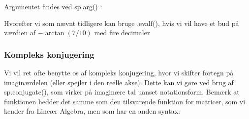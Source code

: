 \documentclass[letterpaper,10pt,english]{jupyterBook}
\begin{document}
\begin{sphinxVerbatim}[commandchars=\\\{\}]
\end{sphinxVerbatim}

\noindent{}

\noindent{}

Argumentet findes ved sp.arg() :

\begin{sphinxVerbatim}[commandchars=\\\{\}]
\end{sphinxVerbatim}

\noindent{}

\noindent{}

Hvorefter vi som nævnt tidligere kan bruge .evalf(), hvis vi vil have et bud på værdien af \(-\arctan (7/10)\) med fire decimaler

\begin{sphinxVerbatim}[commandchars=\\\{\}]
\end{sphinxVerbatim}

\noindent{}


\subsubsection{Kompleks konjugering}
\label{\detokenize{notebooks/sympy/Notebook_kompleks:kompleks-konjugering}}
Vi vil ret ofte benytte os af kompleks konjugering, hvor vi skifter fortegn på imaginærdelen (eller spejler i den reelle akse). Dette kan vi gøre ved brug af sp.conjugate(), som virker på imaginære tal uanset notationsform. Bemærk at funktionen hedder det samme som den tilsvarende funktion for matricer, som vi kender fra Lineær Algebra, men som har en anden syntax:
\end{document}
